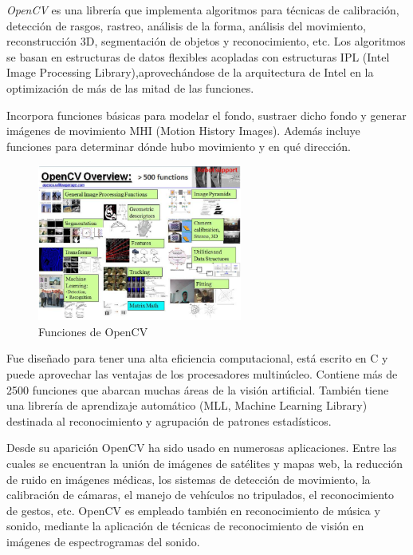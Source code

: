 \textit{OpenCV} es una librería que implementa algoritmos para técnicas de calibración, detección de rasgos, rastreo, análisis de la forma, análisis del movimiento, reconstrucción 3D, segmentación de objetos y reconocimiento, etc. Los algoritmos se basan  en  estructuras de datos flexibles acopladas con estructuras IPL  (Intel  Image Processing Library),aprovechándose de la arquitectura de Intel en la optimización de más de las mitad de las funciones.

Incorpora funciones básicas para modelar el fondo, sustraer dicho  fondo y generar imágenes de movimiento MHI  (Motion  History  Images).  Además  incluye  funciones para determinar dónde hubo movimiento y en qué dirección. 

\begin{figure}[H]
  \begin{center}
    \includegraphics[width=0.6\textwidth]{figures/Herramientas/opencv.png}
		\caption{Funciones de OpenCV}
		\label{fig.opencv}
		\end{center}
\end{figure}

Fue diseñado para tener una alta eficiencia computacional, está escrito en C y puede aprovechar las ventajas de los procesadores multinúcleo. Contiene más  de  2500  funciones  que  abarcan  muchas  áreas  de  la  visión  artificial.  También  tiene  una librería   de   aprendizaje   automático   (MLL,   Machine   Learning   Library)   destinada   al reconocimiento  y agrupación de patrones estadísticos.

Desde su aparición OpenCV ha sido usado en numerosas aplicaciones. Entre las cuales se encuentran la unión de imágenes de satélites y mapas web, la reducción de ruido en imágenes  médicas,  los  sistemas  de  detección  de movimiento,  la  calibración  de  cámaras,  el manejo  de  vehículos  no  tripulados, el  reconocimiento  de  gestos, etc. OpenCV  es  empleado también  en  reconocimiento  de  música  y  sonido,  mediante  la  aplicación  de  técnicas  de reconocimiento de visión en imágenes de espectrogramas del sonido.

